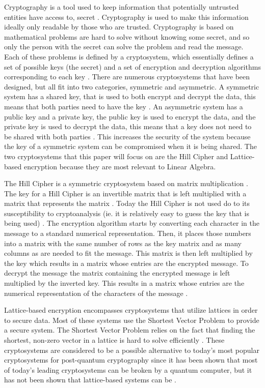 \documentclass{../mathhomework}
\begin{document}
Cryptography is a tool used to keep information that potentially untrusted entities have access to,
secret \cite{menezes97}. Cryptography is used to make this information ideally only readable by those who are 
trusted. Cryptography is based on mathematical problems are hard to solve without knowing some secret, 
and so only the person with the secret can solve the problem and read the message. Each of these problems is 
defined by a cryptosystem, which essentially defines a set of possible keys (the secret) and a set of encryption 
and decryption algorithms corresponding to each key \cite{zwicke03}. There are numerous cryptosystems that have been 
designed, but all fit into two categories, symmetric and asymmetric. A symmetric system has a shared key, that 
is used to both encrypt and decrypt the data, this means that both parties need to have the key \cite{zwicke03}. An 
asymmetric system has a public key and a private key, the public key is used to encrypt the data, and the private 
key is used to decrypt the data, this means that a key does not need to be shared with both parties \cite{zwicke03}. 
This increases the security of the system because the key of a symmetric system can be compromised when it is 
being shared. The two cryptosystems that this paper will focus on are the Hill Cipher and Lattice-based encryption 
because they are most relevant to Linear Algebra.

The Hill Cipher is a symmetric cryptosystem based on matrix multiplication \cite{overbey05}. The key for a Hill Cipher is 
an invertible matrix that is left multiplied with a matrix that represents the matrix  \cite{overbey05}. Today the Hill 
Cipher is not used do to its susceptibility to cryptoanalysis (ie. it is relatively easy to guess the key that is 
being used) \cite{overbey05}. The encryption algorithm starts by converting each character in the message to a 
standard numerical representation. Then, it places those numbers into a matrix with the same number of rows as 
the key matrix and as many columns as are needed to fit the message. This matrix is then left multiplied by the 
key which results in a matrix whose entries are the encrypted message. To decrypt the message the matrix 
containing the encrypted message is left multiplied by the inverted key. This results in a matrix whose entries 
are the numerical representation of the characters of the message \cite{hill29}.

Lattice-based encryption encompasses cryptosystems that utilize lattices in order to secure data. Most of these 
systems use the Shortest Vector Problem to provide a secure system. The Shortest Vector Problem relies on the 
fact that finding the shortest, non-zero vector in a lattice is hard to solve efficiently \cite{ajtai98}. These 
cryptosystems are considered to be a possible alternative to today's most popular cryptosystems for post-quantum 
cryptography since it has been shown that most of today’s leading cryptosystems can be broken by a quantum 
computer, but it has not been shown that lattice-based systems can be \cite{micciancio08}.
\end{document}
